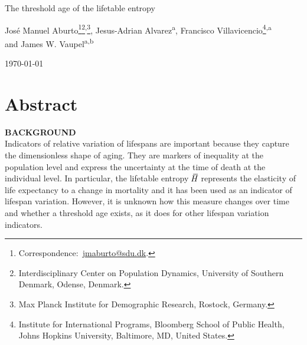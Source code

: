 \documentclass[a4paper,twoside, openright, 12pt, leqno]{article}
\newcommand*\xbar[1]{%
   \hbox{%
     \vbox{%
       \hrule height 0.5pt %
       \kern0.3ex%
       \hbox{%
         \kern-0.28em%
         \ensuremath{#1}%
         \kern-0.05em%
       }%
     }%
   }%
}
\newcommand\fnsep{\textsuperscript{,}}
\begin{document}
\renewcommand{\thefootnote}{\alph{footnote}}

\thispagestyle{empty}

\begin{center}
    
    \vspace*{1cm}
    \LARGE{The threshold age of the lifetable entropy}	
    \vspace{.4cm}    
        
           
    \vspace{1cm}
    \large Jos\'e Manuel Aburto\footnote[*]{Correspondence:~\href{mailto:jmaburto@sdu.dk}{jmaburto@sdu.dk}.}\footnote{Interdisciplinary Center on Population Dynamics, University of Southern Denmark, Odense, Denmark.}\fnsep\footnote{Max Planck Institute for Demographic Research, Rostock, Germany.}, Jesus-Adrian Alvarez\textsuperscript{a}, Francisco Villavicencio\footnote{Institute for International Programs, Bloomberg School of Public Health, Johns Hopkins University, Baltimore, MD, United States.}\fnsep\textsuperscript{a}\\ and James W. Vaupel\textsuperscript{a}\fnsep\textsuperscript{b}
    
    \vspace{1cm}
    \large\today
    \vspace{1cm}
       
\end{center}

\renewcommand{\thefootnote}{\arabic{footnote}}
\setcounter{footnote}{0}


\section*{Abstract}
\bigskip

\textbf{BACKGROUND} \\
Indicators of relative variation of lifespans are important because they capture the dimensionless shape of aging. They are markers of inequality at the population level and express the uncertainty at the time of death at the individual level. In particular, the lifetable entropy $\,\xbar{H}$ represents the elasticity of life expectancy to a change in mortality and it has been used as an indicator of lifespan variation. However, it is unknown how this measure changes over time and whether a threshold age exists, as it does for other lifespan variation indicators.
\bigskip
\end{document}
